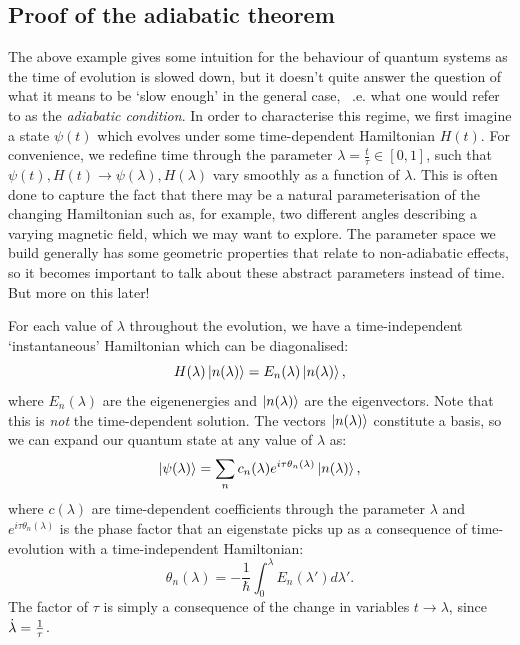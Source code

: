    \subsection{Proof of the adiabatic theorem}\label{sec:2.1.1_proof_adiabatic_theorem}

    The above example gives some intuition for the behaviour of quantum systems as the time of evolution is slowed down, but it doesn't quite answer the question of what it means to be `slow enough' in the general case, ~\@i.e. what one would refer to as the \emph{adiabatic condition}. In order to characterise this regime, we first imagine a state $\psi(t)$ which evolves under some time-dependent Hamiltonian $H(t)$. For convenience, we redefine time through the parameter $\lambda = \frac{t}{\tau} \in [0,1]$, such that $\psi(t), H(t) \rightarrow \psi(\lambda), H(\lambda)$ vary smoothly as a function of $\lambda$. This is often done to capture the fact that there may be a natural parameterisation of the changing Hamiltonian such as, for example, two different angles describing a varying magnetic field, which we may want to explore. The parameter space we build generally has some geometric properties that relate to non-adiabatic effects, so it becomes important to talk about these abstract parameters instead of time. But more on this later!
    
    For each value of $\lambda$ throughout the evolution, we have a time-independent `instantaneous' Hamiltonian which can be diagonalised:
    \begin{equation}\label{eq:instantaneous_schroedinger}
        H(\lambda)\ket{n(\lambda)} = E_n(\lambda)\ket{n(\lambda)},
    \end{equation}
    where $E_n(\lambda)$ are the eigenenergies and $\ket{n(\lambda)}$ are the eigenvectors. Note that this is \emph{not} the time-dependent solution. The vectors $\ket{n(\lambda)}$ constitute a basis, so we can expand our quantum state at any value of $\lambda$ as:
    \begin{equation}\label{eq:adiabatic_basis_expansion}
        \ket{\psi(\lambda)} = \sum_n c_n(\lambda)e^{i \tau \theta_n(\lambda)}\ket{n(\lambda)},
    \end{equation}
    where $c(\lambda)$ are time-dependent coefficients through the parameter $\lambda$ and $e^{i \tau \theta_n(\lambda)}$ is the phase factor that an eigenstate picks up as a consequence of time-evolution with a time-independent Hamiltonian:
    \begin{equation}\label{eq:dynamical_phase}
        \theta_n(\lambda) = -\frac{1}{\hbar} \int_0^{\lambda} E_n(\lambda') d\lambda'.
    \end{equation}
    The factor of $\tau$ is simply a consequence of the change in variables $t \rightarrow \lambda$, since $\dot{\lambda} = \frac{1}{\tau}$.
    
